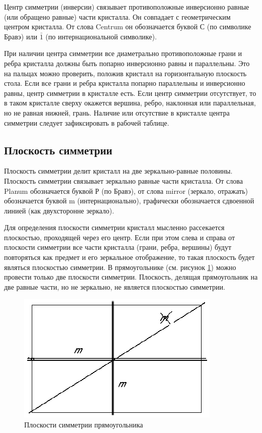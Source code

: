 \documentclass[a4paper, 12pt]{article}
\begin{document}
Центр симметрии (инверсии) связывает противоположные инверсионно равные (или обращено равные) части кристалла. Он совпадает с геометрическим центром кристалла. От слова Centrum он обозначается буквой С (по символике Бравэ) или $\bar{1}$ (по интернациональной символике).

При наличии центра симметрии все диаметрально противоположные грани и ребра кристалла должны быть попарно инверсионно равны и параллельны. Это на пальцах можно проверить, положив кристалл на горизонтальную плоскость стола. Если все грани и ребра кристалла попарно параллельны и инверсионно равны, центр симметрии в кристалле есть. Если центр симметрии отсутствует, то в таком кристалле сверху окажется вершина, ребро, наклонная или параллельная, но не равная нижней, грань. Наличие или отсутствие в кристалле центра симметрии следует зафиксировать в рабочей таблице.

\subsection{Плоскость симметрии}

Плоскость симметрии делит кристалл на две зеркально-равные половины. Плоскость симметрии связывает зеркально равные части кристалла. От слова Planum обозначается буквой Р (по Бравэ), от слова mirror (зеркало, отражать) обозначается буквой m (интернационально), графически обозначается сдвоенной линией (как двухсторонне зеркало).

Для определения плоскости симметрии кристалл мысленно рассекается плоскостью, проходящей через его центр. Если при этом слева и справа от плоскости симметрии все части кристалла (грани, ребра, вершины) будут повторяться как предмет и его зеркальное отображение, то такая плоскость будет являться плоскостью симметрии.
В прямоугольнике (см. рисунок \ref{fig:rect}) можно провести только две плоскости симметрии. Плоскость, делящая прямоугольник на две равные части, но не зеркально, не является плоскостью симметрии.

\begin{figure}[H]
	\centering
	\includegraphics[width=0.5\linewidth]{Rectangle}
	\caption{Плоскости симметрии прямоугольника}
	\label{fig:rect}
\end{figure}
\end{document}

